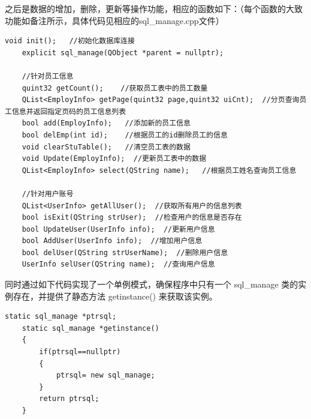 \documentclass{article}
\begin{document}
之后是数据的增加，删除，更新等操作功能，相应的函数如下：（每个函数的大致功能如备注所示，具体代码见相应的sql\_manage.cpp文件）
\begin{lstlisting}[style=qtstyle, caption={Qt代码示例}, label=qt_example]
    void init();   //初始化数据库连接
    explicit sql_manage(QObject *parent = nullptr);
    
    //针对员工信息
    quint32 getCount();    //获取员工表中的员工数量
    QList<EmployInfo> getPage(quint32 page,quint32 uiCnt);  //分页查询员工信息并返回指定页码的员工信息列表
    bool add(EmployInfo);   //添加新的员工信息
    bool delEmp(int id);    //根据员工的id删除员工的信息
    void clearStuTable();   //清空员工表的数据
    void Update(EmployInfo);  //更新员工表中的数据
    QList<EmployInfo> select(QString name);   //根据员工姓名查询员工信息
    
    //针对用户账号
    QList<UserInfo> getAllUser();  //获取所有用户的信息列表
    bool isExit(QString strUser);  //检查用户的信息是否存在
    bool UpdateUser(UserInfo info);  //更新用户信息
    bool AddUser(UserInfo info);  //增加用户信息
    bool delUser(QString strUserName);  //删除用户信息
    UserInfo selUser(QString name);  //查询用户信息
\end{lstlisting}
\indent
同时通过如下代码实现了一个单例模式，确保程序中只有一个 sql\_manage 类的实例存在，并提供了静态方法 getinstance() 来获取该实例。
\begin{lstlisting}[style=qtstyle, caption={Qt代码示例}, label=qt_example]
    static sql_manage *ptrsql;
    static sql_manage *getinstance()
    {
        if(ptrsql==nullptr)
        {
            ptrsql= new sql_manage;
        }
        return ptrsql;
    }
\end{lstlisting}
\end{document}
